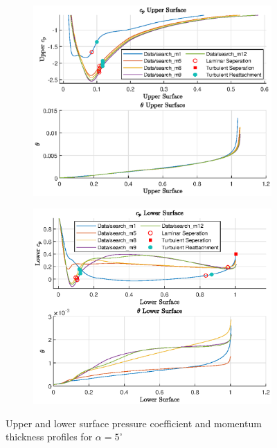 \documentclass{article}
\begin{document}
\begin{figure}[H]
    \begin{subfigure}{0.49\textwidth}
        \centering
        \includegraphics[width=1.1\textwidth, center]{figures/loRe_upperprofile_12_a5.eps}
        \caption{}
        \label{fig:m12_uprofile}
    \end{subfigure}
    \begin{subfigure}{0.49\textwidth}
        \centering
        \includegraphics[width=1.15\textwidth, center]{figures/loRe_lowerprofile_12_a5.eps}
        \caption{}
        \label{fig:m12_lprofile}
    \end{subfigure}
    \caption{Upper and lower surface pressure coefficient and momentum thickness profiles for $\alpha = 5^\circ$}
\end{figure}
\end{document}
